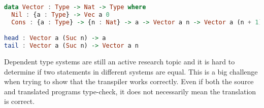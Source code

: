 \documentclass[parskip=half]{scrartcl}
\begin{document}


\begin{lstlisting}[language=Haskell,label={lst:depex},caption={ \textit{n} is a type parameter, in this case it is a natural number.  }]
data Vector : Type -> Nat -> Type where
  Nil : {a : Type} -> Vec a 0
  Cons : {a : Type} -> {n : Nat} -> a -> Vector a n -> Vector a (n + 1)

head : Vector a (Suc n) -> a
tail : Vector a (Suc n) -> Vector a n
\end{lstlisting}








Dependent type systems are still an active research topic and it is hard
to determine if two statements in different systems are equal. This is
a big challenge when trying to show that the transpiler works correctly.
Even if both the source and translated programs type-check, it does not
necessarily mean the translation is correct.
\end{document}
